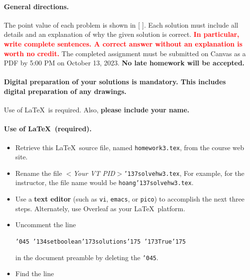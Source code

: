 \documentclass[11pt,twoside]{article}
\newcommand{\mybackslash}{\char'134}
\newcommand{\myleftbracket}{\char'173}
\newcommand{\myrightbracket}{\char'175}
\newcommand{\mypercent}{\char'045}
\newcommand{\myunderscore}{\char'137}
\newcommand{\duedate}{October 13, 2023}
\newcommand{\homeworknumber}{3}
\newcounter{problem}
\begin{document}
{
\begingroup %
\paragraph{General directions.}
The point value of each problem is shown in [ ].
Each solution must include all details and
an explanation of why the given solution is correct.
\textbf{\textcolor{red}{In particular,
write complete sentences.
A correct answer without an explanation is worth no credit.}}
The completed assignment must be submitted on Canvas as a PDF by 5:00 PM
on \duedate.
\textbf{No late homework will be accepted.}

\paragraph{Digital preparation of your solutions is mandatory.
This includes digital preparation of any drawings.}
Use of \LaTeX\ is required.
Also,
\textbf{please include your name.}

\paragraph{Use of \LaTeX\ (required).}
\begin{itemize}
\item Retrieve this \LaTeX\ source file,
named
\texttt{homework\homeworknumber.tex},
from the course web site.
\item Rename the file
\textit{$<$Your VT PID$>$}\texttt{{\myunderscore}solvehw\homeworknumber.tex},
For example,
for the instructor,
the file name would be
\texttt{hoang{\myunderscore}solvehw\homeworknumber.tex}.

\item
Use a \textbf{text editor}
(such as \texttt{vi}, \texttt{emacs}, or \texttt{pico})
to accomplish the next three steps.
Alternately,
use Overleaf as your \LaTeX\ platform.

\item
Uncomment the line

\texttt{{\mypercent} 
{\mybackslash}setboolean{\myleftbracket}solutions{\myrightbracket}%
{\myleftbracket}True{\myrightbracket}}

in the document preamble by deleting the \texttt{\mypercent}.

\item
Find the line


\end{itemize}}
\end{document}
